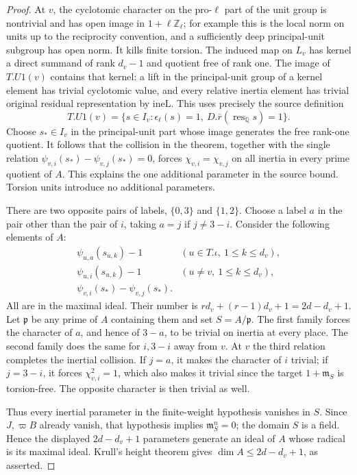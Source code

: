 \begin{proof}
At \(v\), the cyclotomic character on the pro-\(\ell\) part of the
unit group is nontrivial and has open image in
\(1+\ell\mathbb Z_\ell\); for example this is the local norm on
units up to the reciprocity convention, and a sufficiently deep
principal-unit subgroup has open norm. It kills finite torsion.
The induced map on \(L_v\) has kernel a direct summand of
rank \(d_v-1\) and quotient free of rank one. The image of
\(T.U1(v)\) contains that kernel: a lift in the principal-unit
group of a kernel element has trivial cyclotomic value,
and every relative inertia element has trivial original residual
representation by \(\mathrm{ineL}\).
This uses precisely the source definition
\[
 T.U1(v)=\{s\in I_v:\epsilon_\ell(s)=1,\
                         D.\bar r(\operatorname{res}_{\mathbb Q}s)=1\}.
\]
Choose \(s_*\in I_v\) in the principal-unit part whose image
generates the free rank-one quotient. It follows that the
collision in the theorem, together with the single relation
\(\psi_{v,i}(s_*)-\psi_{v,j}(s_*)=0\), forces
\(\chi_{v,i}=\chi_{v,j}\) on all inertia in every prime quotient
of \(A\). This explains the one additional parameter in the source
bound. Torsion units introduce no additional parameters.

There are two opposite pairs of labels, \(\{0,3\}\) and
\(\{1,2\}\). Choose a label \(a\) in the pair other than the pair
of \(i\), taking \(a=j\) if \(j\ne3-i\). Consider the following
elements of \(A\):
\[
\begin{array}{ll}
 \psi_{u,a}(s_{u,k})-1
       & (u\in T.\iota,\ 1\leq k\leq d_v),\\
 \psi_{u,i}(s_{u,k})-1
       & (u\ne v,\ 1\leq k\leq d_v),\\
 \psi_{v,i}(s_*)-\psi_{v,j}(s_*).&
\end{array}
\]
All are in the maximal ideal. Their number is
\(rd_v+(r-1)d_v+1=2d-d_v+1\).
Let \(\mathfrak p\) be any prime of \(A\) containing them and set
\(S=A/\mathfrak p\). The first family forces the character of
\(a\), and hence of \(3-a\), to be trivial on inertia at every
place. The second family does the same for \(i,3-i\) away from
\(v\). At \(v\) the third relation completes the inertial
collision. If \(j=a\), it makes the character of \(i\) trivial;
if \(j=3-i\), it forces \(\chi_{v,i}^2=1\), which also makes it
trivial since the target \(1+\mathfrak m_S\) is torsion-free.
The opposite character is then trivial as well.

Thus every inertial parameter in the finite-weight hypothesis
vanishes in \(S\). Since \(J,\varpi B\) already vanish, that
hypothesis implies \(\mathfrak m_S^n=0\); the domain \(S\) is a
field. Hence the displayed \(2d-d_v+1\) parameters generate
an ideal of \(A\) whose radical is its maximal ideal. Krull's
height theorem gives \(\dim A\leq2d-d_v+1\), as asserted.
\end{proof}

